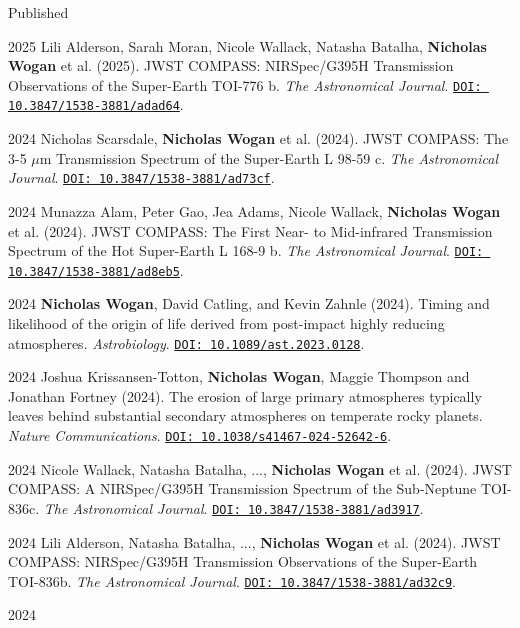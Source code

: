 \documentclass[12pt]{article}
\begin{document}
\noindent Published

\begin{cvlist}
\item[2025]
  Lili Alderson, Sarah Moran, Nicole Wallack, Natasha Batalha, \textbf{Nicholas Wogan} et al. (2025). JWST COMPASS: NIRSpec/G395H Transmission Observations of the Super-Earth TOI-776 b. \emph{The Astronomical Journal}. \href{https://doi.org/10.3847/1538-3881/adad64}{\nolinkurl{DOI: 10.3847/1538-3881/adad64}}.
\item[2024]
  Nicholas Scarsdale, \textbf{Nicholas Wogan} et al. (2024). JWST COMPASS: The 3-5 $\mu$m Transmission Spectrum of the Super-Earth L 98-59 c. \emph{The Astronomical Journal}. \href{https://doi.org/10.3847/1538-3881/ad73cf}{\nolinkurl{DOI: 10.3847/1538-3881/ad73cf}}.
\item[2024]
  Munazza Alam, Peter Gao, Jea Adams, Nicole Wallack, \textbf{Nicholas Wogan} et al. (2024). JWST COMPASS: The First Near- to Mid-infrared Transmission Spectrum of the Hot Super-Earth L 168-9 b. \emph{The Astronomical Journal}. \href{https://doi.org/10.3847/1538-3881/ad8eb5}{\nolinkurl{DOI: 10.3847/1538-3881/ad8eb5}}.
\item[2024]
  \textbf{Nicholas Wogan}, David Catling, and Kevin Zahnle (2024). Timing and likelihood of the origin of life derived from post-impact highly reducing atmospheres. \emph{Astrobiology}. \href{https://doi.org/10.1089/ast.2023.0128}{\nolinkurl{DOI: 10.1089/ast.2023.0128}}.
\item[2024]
  Joshua Krissansen-Totton, \textbf{Nicholas Wogan}, Maggie Thompson and Jonathan Fortney (2024). The erosion of large primary atmospheres typically leaves behind substantial secondary atmospheres on temperate rocky planets. \emph{Nature Communications}. \href{https://doi.org/10.1038/s41467-024-52642-6}{\nolinkurl{DOI: 10.1038/s41467-024-52642-6}}.
\item[2024]
  Nicole Wallack, Natasha Batalha, ..., \textbf{Nicholas Wogan} et al. (2024). JWST COMPASS: A NIRSpec/G395H Transmission Spectrum of the Sub-Neptune TOI-836c. \emph{The Astronomical Journal}. \href{https://doi.org/10.3847/1538-3881/ad3917}{\nolinkurl{DOI: 10.3847/1538-3881/ad3917}}.
\item[2024]
  Lili Alderson, Natasha Batalha, ..., \textbf{Nicholas Wogan} et al. (2024). JWST COMPASS: NIRSpec/G395H Transmission Observations of the Super-Earth TOI-836b. \emph{The Astronomical Journal}. \href{https://doi.org/10.3847/1538-3881/ad32c9}{\nolinkurl{DOI: 10.3847/1538-3881/ad32c9}}.
\item[2024]

\end{cvlist}
\end{document}
